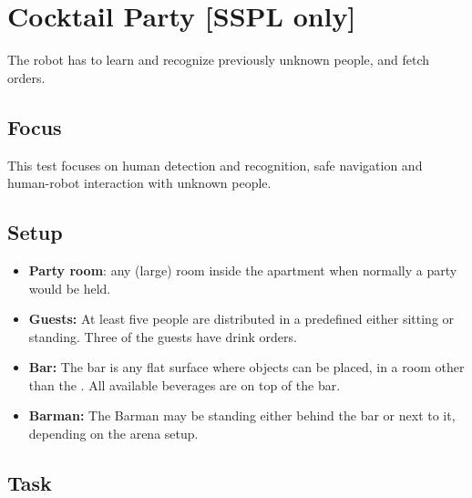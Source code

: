 \section{Cocktail Party [SSPL only]}

The robot has to learn and recognize previously unknown people, and fetch orders.

\subsection{Focus}

This test focuses on human detection and recognition, safe navigation and human-robot interaction with unknown people.

\subsection{Setup}
\begin{itemize}
	\item \textbf{Party room}: any (large) room inside the apartment when normally a party would be held.
	\item \textbf{Guests:} At least five people are distributed in a predefined  either sitting or standing.
                Three of the guests have drink orders.
	\item \textbf{Bar:} The bar is any flat surface where objects can be placed, in a room other than the .
                All available beverages are on top of the bar.
	\item \textbf{Barman:} The Barman may be standing either behind the bar or next to it, depending on the arena setup.
\end{itemize}

\subsection{Task}

